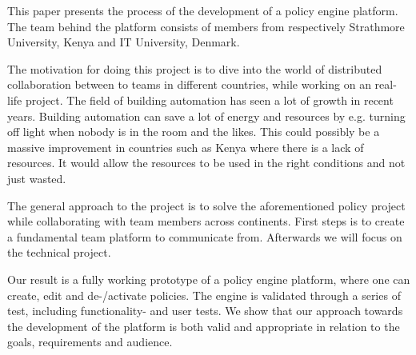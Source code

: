 This paper presents the process of the development of a policy engine platform. The team behind the platform consists of members from respectively Strathmore University, Kenya and IT University, Denmark. 

The motivation for doing this project is to dive into the world of distributed collaboration between to teams in different countries, while working on an real-life project. The field of building automation has seen a lot of growth in recent years. Building automation can save a lot of energy and resources by e.g. turning off light when nobody is in the room and the likes. This could possibly be a massive improvement in countries such as Kenya where there is a lack of resources. It would allow the resources to be used in the right conditions and not just wasted.

The general approach to the project is to solve the aforementioned policy project while collaborating with team members across continents. First steps is to create a fundamental team platform to communicate from. Afterwards we will focus on the technical project.

Our result is a fully working prototype of a policy engine platform, where one can create, edit and de-/activate policies. The engine is validated through a series of test, including functionality- and user tests. We show that our approach towards the development of the platform is both valid and appropriate in relation to the goals, requirements and audience.